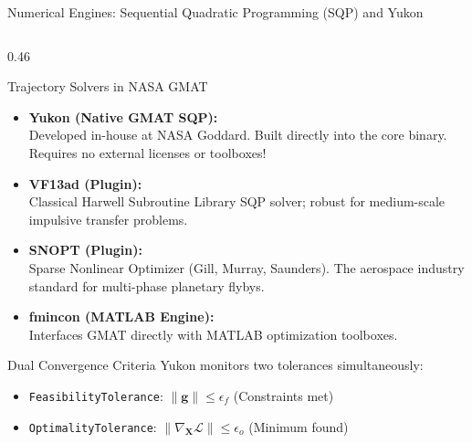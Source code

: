 \documentclass[aspectratio=169, 10pt]{beamer}
\begin{document}
\begin{frame}{Numerical Engines: Sequential Quadratic Programming (SQP) and Yukon}
\begin{columns}[t]
        \begin{column}{0.46\textwidth}
            \begin{block}{Trajectory Solvers in NASA GMAT}
                \scriptsize
                \begin{itemize}\setlength{\itemsep}{1.5pt}\setlength{\topsep}{2pt}
                    \item \textbf{Yukon (Native GMAT SQP):} \\
                    Developed in-house at NASA Goddard. Built directly into the core binary. Requires no external licenses or toolboxes!
                    \item \textbf{VF13ad (Plugin):} \\
                    Classical Harwell Subroutine Library SQP solver; robust for medium-scale impulsive transfer problems.
                    \item \textbf{SNOPT (Plugin):} \\
                    Sparse Nonlinear Optimizer (Gill, Murray, Saunders). The aerospace industry standard for multi-phase planetary flybys.
                    \item \textbf{fmincon (MATLAB Engine):} \\
                    Interfaces GMAT directly with MATLAB optimization toolboxes.
                \end{itemize}
            \end{block}

            \vspace{-0.15cm}

            \begin{alertblock}{Dual Convergence Criteria}
                \scriptsize
                Yukon monitors two tolerances simultaneously:
                \begin{itemize}\setlength{\itemsep}{0pt}\setlength{\topsep}{1pt}
                    \item \texttt{FeasibilityTolerance}: $\|\mathbf{g}\| \le \epsilon_f$ (Constraints met)
                    \item \texttt{OptimalityTolerance}: $\|\nabla_{\mathbf{X}} \mathcal{L}\| \le \epsilon_o$ (Minimum found)
                \end{itemize}
            \end{alertblock}
        \end{column}
    \end{columns}
\end{frame}
\end{document}
